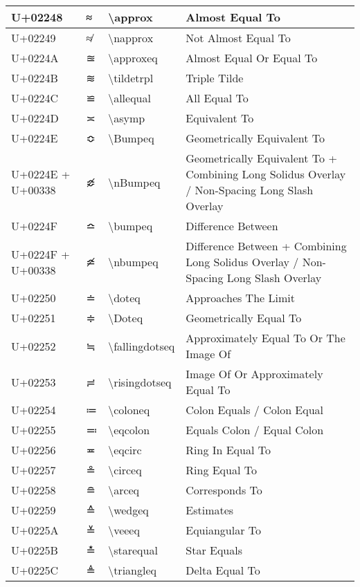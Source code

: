 \begin{table}[h]
\begin{tabulary}{\linewidth}{|L|L|L|L|}
U+02248 & ≈ & {\textbackslash}approx & Almost Equal To \\
\hline
U+02249 & ≉ & {\textbackslash}napprox & Not Almost Equal To \\
\hline
U+0224A & ≊ & {\textbackslash}approxeq & Almost Equal Or Equal To \\
\hline
U+0224B & ≋ & {\textbackslash}tildetrpl & Triple Tilde \\
\hline
U+0224C & ≌ & {\textbackslash}allequal & All Equal To \\
\hline
U+0224D & ≍ & {\textbackslash}asymp & Equivalent To \\
\hline
U+0224E & ≎ & {\textbackslash}Bumpeq & Geometrically Equivalent To \\
\hline
U+0224E + U+00338 & ≎̸ & {\textbackslash}nBumpeq & Geometrically Equivalent To + Combining Long Solidus Overlay / Non-Spacing Long Slash Overlay \\
\hline
U+0224F & ≏ & {\textbackslash}bumpeq & Difference Between \\
\hline
U+0224F + U+00338 & ≏̸ & {\textbackslash}nbumpeq & Difference Between + Combining Long Solidus Overlay / Non-Spacing Long Slash Overlay \\
\hline
U+02250 & ≐ & {\textbackslash}doteq & Approaches The Limit \\
\hline
U+02251 & ≑ & {\textbackslash}Doteq & Geometrically Equal To \\
\hline
U+02252 & ≒ & {\textbackslash}fallingdotseq & Approximately Equal To Or The Image Of \\
\hline
U+02253 & ≓ & {\textbackslash}risingdotseq & Image Of Or Approximately Equal To \\
\hline
U+02254 & ≔ & {\textbackslash}coloneq & Colon Equals / Colon Equal \\
\hline
U+02255 & ≕ & {\textbackslash}eqcolon & Equals Colon / Equal Colon \\
\hline
U+02256 & ≖ & {\textbackslash}eqcirc & Ring In Equal To \\
\hline
U+02257 & ≗ & {\textbackslash}circeq & Ring Equal To \\
\hline
U+02258 & ≘ & {\textbackslash}arceq & Corresponds To \\
\hline
U+02259 & ≙ & {\textbackslash}wedgeq & Estimates \\
\hline
U+0225A & ≚ & {\textbackslash}veeeq & Equiangular To \\
\hline
U+0225B & ≛ & {\textbackslash}starequal & Star Equals \\
\hline
U+0225C & ≜ & {\textbackslash}triangleq & Delta Equal To \\

\end{tabulary}
\end{table}
